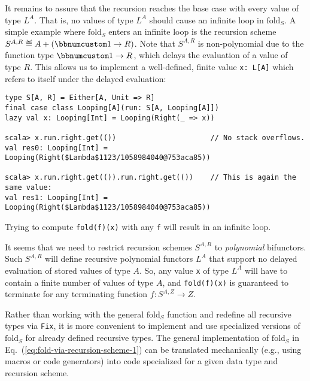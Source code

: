 It remains to assure that the recursion reaches the base case with
every value of type $L^{A}$. That is, no values of type $L^{A}$
should cause an infinite loop in $\text{fold}_{S}$. A simple example
where $\text{fold}_{S}$ enters an infinite loop is the recursion
scheme $S^{A,R}\triangleq A+(\bbnum 1\rightarrow R)$. Note that $S^{A,R}$
is non-polynomial due to the function type $\bbnum 1\rightarrow R$,
which delays the evaluation of a value of type $R$. This allows us
to implement a well-defined, finite value \lstinline!x: L[A]! which
refers to itself under the delayed evaluation:
\begin{lstlisting}
type S[A, R] = Either[A, Unit => R]
final case class Looping[A](run: S[A, Looping[A]])
lazy val x: Looping[Int] = Looping(Right(_ => x))

scala> x.run.right.get(())                      // No stack overflows.
val res0: Looping[Int] = Looping(Right($Lambda$1123/1058984040@753aca85)) 

scala> x.run.right.get(()).run.right.get(())    // This is again the same value:
val res1: Looping[Int] = Looping(Right($Lambda$1123/1058984040@753aca85))
\end{lstlisting}
Trying to compute \lstinline!fold(f)(x)! with any \lstinline!f!
will result in an infinite loop.

It seems that we need to restrict recursion schemes $S^{A,R}$ to
\emph{polynomial} bifunctors. Such $S^{A,R}$ will define recursive
polynomial functors $L^{A}$ that support no delayed evaluation of
stored values of type $A$. So, any value \lstinline!x! of type $L^{A}$
will have to contain a finite number of values of type $A$, and \lstinline!fold(f)(x)!
is guaranteed to terminate for any terminating function $f:S^{A,Z}\rightarrow Z$.

Rather than working with the general $\text{fold}_{S}$ function and
redefine all recursive types via \lstinline!Fix!, it is more convenient
to implement and use specialized versions of $\text{fold}_{S}$ for
already defined recursive types. The general implementation of $\text{fold}_{S}$
in Eq.~(\ref{eq:fold-via-recursion-scheme-1}) can be translated
mechanically (e.g., using macros or code generators) into code specialized
for a given data type and recursion scheme.

